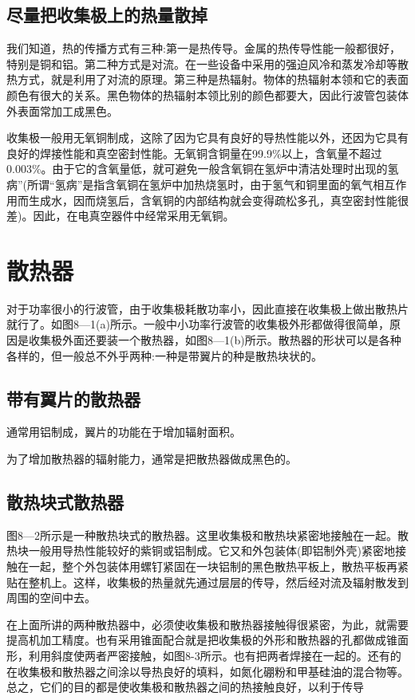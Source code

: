 \subsection{尽量把收集极上的热量散掉}
我们知道，热的传播方式有三种:第一是热传导。金属的热传导性能一般都很好，特别是铜和铝。第二种方式是对流。在一些设备中采用的强迫风冷和蒸发冷却等散热方式，就是利用了对流的原理。第三种是热辐射。物体的热辐射本领和它的表面颜色有很大的关系。黑色物体的热辐射本领比别的颜色都要大，因此行波管包装体外表面常加工成黑色。


收集极一般用无氧铜制成，这除了因为它具有良好的导热性能以外，还因为它具有良好的焊接性能和真空密封性能。无氧铜含铜量在99.9\%以上，含氧量不超过0.003\%。由于它的含氧量低，就可避免一般含氧铜在氢炉中清洁处理时出现的氢病”(所谓“氢病”是指含氧铜在氢炉中加热烧氢时，由于氢气和铜里面的氧气相互作用而生成水，因而烧氢后，含氧铜的内部结构就会变得疏松多孔，真空密封性能很差)。因此，在电真空器件中经常采用无氧铜。



\section{散热器}
对于功率很小的行波管，由于收集极耗散功率小，因此直接在收集极上做出散热片就行了。如图8—1(a)所示。一般中小功率行波管的收集极外形都做得很简单，原因是收集极外面还要装一个散热器，如图8—1(b)所示。散热器的形状可以是各种各样的，但一般总不外乎两种:一种是带翼片的种是散热块状的。


\subsection{带有翼片的散热器}


通常用铝制成，翼片的功能在于增加辐射面积。


为了增加散热器的辐射能力，通常是把散热器做成黑色的。
\subsection{散热块式散热器}

图8—2所示是一种散热块式的散热器。这里收集极和散热块紧密地接触在一起。散热块一般用导热性能较好的紫铜或铝制成。它又和外包装体(即铝制外壳)紧密地接触在一起，整个外包装体用螺钉紧固在一块铝制的黑色散热平板上，散热平板再紧贴在整机上。这样，收集极的热量就先通过层层的传导，然后经对流及辐射散发到周围的空间中去。


在上面所讲的两种散热器中，必须使收集极和散热器接触得很紧密，为此，就需要提高机加工精度。也有采用锥面配合就是把收集极的外形和散热器的孔都做成锥面形，利用斜度使两者严密接触，如图8-3所示。也有把两者焊接在一起的。还有的在收集极和散热器之间涂以导热良好的填料，如氮化硼粉和甲基硅油的混合物等。总之，它们的目的都是使收集极和散热器之间的热接触良好，以利于传导



